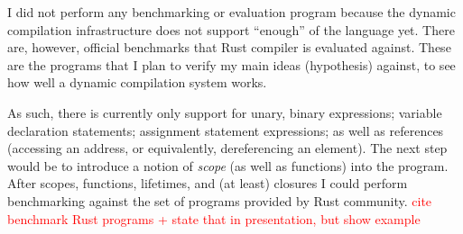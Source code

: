I did not perform any benchmarking or evaluation
program because the dynamic compilation infrastructure
does not support ``enough'' of the language yet.
There are, however, official benchmarks that Rust
compiler is evaluated against. These are the
programs that I plan to verify my main ideas (hypothesis)
against, to see how well a dynamic compilation system works.

As such, there is currently only support for
unary, binary expressions; variable declaration
statements; assignment statement expressions;
as well as references (accessing an address,
or equivalently, dereferencing an element).
The next step would be to introduce a notion of \textit{scope}
(as well as functions) into the program.
After scopes, functions, lifetimes, and (at least) closures
I could perform benchmarking against the set of programs
provided by Rust community. \textcolor{red}{cite benchmark Rust programs
+ state that in presentation, but show example}

